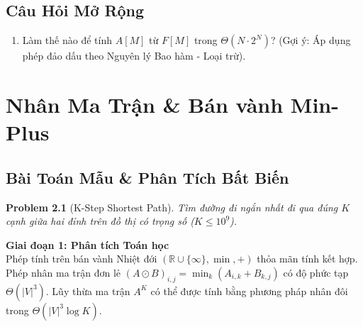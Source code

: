 \documentclass[11pt, letterpaper]{report}
\newtheorem{baitoan}{Problem}[chapter]
\begin{document}
\section{Câu Hỏi Mở Rộng}
\begin{enumerate}
 \item Làm thế nào để tính $A[M]$ từ $F[M]$ trong $\Theta(N \cdot 2^N)$? (Gợi ý: Áp dụng phép đảo dấu theo Nguyên lý Bao hàm - Loại trừ).
\end{enumerate}

\chapter{Nhân Ma Trận \& Bán vành Min-Plus}
\label{mod:matrix_exp}

\section{Bài Toán Mẫu \& Phân Tích Bất Biến}
\begin{baitoan}[K-Step Shortest Path]
Tìm đường đi ngắn nhất đi qua đúng $K$ cạnh giữa hai đỉnh trên đồ thị có trọng số ($K \le 10^9$).
\end{baitoan}

\noindent\textbf{Giai đoạn 1: Phân tích Toán học}\\
Phép tính trên bán vành Nhiệt đới $(\mathbb{R} \cup \{\infty\}, \min, +)$ thỏa mãn tính kết hợp. Phép nhân ma trận đơn lẻ $(A \odot B)_{i, j} = \min_k (A_{i, k} + B_{k, j})$ có độ phức tạp $\Theta(|V|^3)$. Lũy thừa ma trận $A^K$ có thể được tính bằng phương pháp nhân đôi trong $\Theta(|V|^3 \log K)$.
\end{document}

